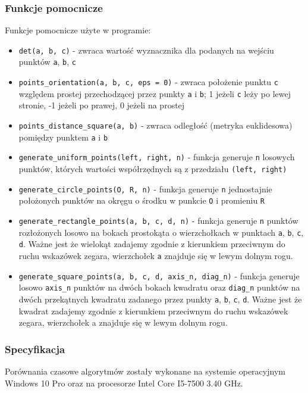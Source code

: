\documentclass[a4paper,11pt]{article}
\begin{document}
\subsubsection{Funkcje pomocnicze}
Funkcje pomocnicze użyte w programie:
\begin{itemize}
\item \verb _det(a, b, c)_ - zwraca wartość wyznacznika dla podanych na wejściu punktów \verb +a+, \verb +b+, \verb +c+
\item \verb +points_orientation(a, b, c, eps = 0)+ - zwraca położenie punktu \verb +c+ względem prostej przechodzącej przez punkty \verb +a+ i \verb +b+; 1 jeżeli \verb +c+ leży po lewej stronie, -1 jeżeli po prawej, 0 jeżeli na prostej
\item \verb +points_distance_square(a, b)+ - zwraca odległość (metryka euklidesowa) pomiędzy punktem \verb +a+ i \verb +b+
\item \verb +generate_uniform_points(left, right, n)+ - funkcja generuje \verb +n+ losowych punktów, których wartości współrzędnych są z przedziału \verb +(left, right)+
\item \verb +generate_circle_points(O, R, n)+ - funkcja generuje \verb +n+ jednostajnie położonych punktów na okręgu o środku w punkcie \verb +O+ i promieniu \verb +R+
\item \verb +generate_rectangle_points(a, b, c, d, n)+ - funkcja generuje \verb +n+ punktów rozłożonych losowo na bokach prostokąta o wierzchołkach w punktach \verb +a+, \verb +b+, \verb +c+, \verb +d+. Ważne jest że wielokąt zadajemy zgodnie z kierunkiem przeciwnym do ruchu wskazówek zegara, wierzchołek \verb +a+ znajduje się w lewym dolnym rogu.
\item \verb +generate_square_points(a, b, c, d, axis_n, diag_n)+ - funkcja generuje losowo \verb +axis_n+ punktów na dwóch bokach kwadratu oraz \verb +diag_n+ punktów na dwóch przekątnych kwadratu zadanego przez punkty \verb +a+, \verb +b+, \verb +c+, \verb +d+. Ważne jest że kwadrat zadajemy zgodnie z kierunkiem przeciwnym do ruchu wskazówek zegara, wierzchołek a znajduje się w lewym dolnym rogu.
\end{itemize}

\subsubsection{Specyfikacja}
Porównania czasowe algorytmów zostały wykonane na systemie operacyjnym Windows 10 Pro oraz na procesorze Intel Core I5-7500 3.40 GHz.
\end{document}
